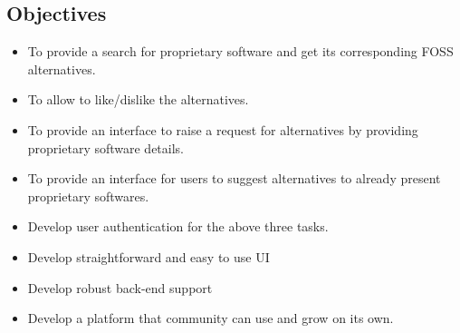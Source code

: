 \subsection{Objectives}
\begin{itemize}
\item To provide a search for proprietary software and get its corresponding FOSS alternatives.
\item To allow to like/dislike the alternatives.
\item To provide an interface to raise a request for alternatives by providing proprietary software details.
\item To provide an interface for users to suggest alternatives to already present proprietary softwares.
\item Develop user authentication for the above three tasks.
\item Develop straightforward and easy to use UI
\item Develop robust back-end support
\item Develop a platform that community can use and grow on its own.
\end{itemize}